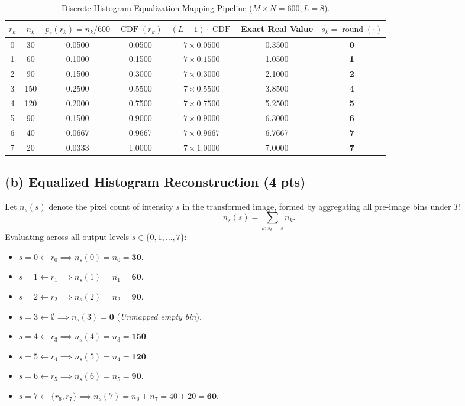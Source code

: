 \documentclass[11pt,a4paper]{article}
\begin{document}
\begin{table}[htbp]
\centering
\caption{Discrete Histogram Equalization Mapping Pipeline ($M \times N = 600, L = 8$).}
\label{tab:p5_equalization}
\begin{tabular}{ccccccc}
\toprule
\textbf{$r_k$} & \textbf{$n_k$} & \textbf{$p_r(r_k) = n_k/600$} & \textbf{$\operatorname{CDF}(r_k)$} & \textbf{$(L-1) \cdot \operatorname{CDF}$} & \textbf{Exact Real Value} & \textbf{$s_k = \operatorname{round}(\cdot)$} \\
\midrule
0 & 30  & 0.0500 & 0.0500 & $7 \times 0.0500$ & 0.3500 & \textbf{0} \\
1 & 60  & 0.1000 & 0.1500 & $7 \times 0.1500$ & 1.0500 & \textbf{1} \\
2 & 90  & 0.1500 & 0.3000 & $7 \times 0.3000$ & 2.1000 & \textbf{2} \\
3 & 150 & 0.2500 & 0.5500 & $7 \times 0.5500$ & 3.8500 & \textbf{4} \\
4 & 120 & 0.2000 & 0.7500 & $7 \times 0.7500$ & 5.2500 & \textbf{5} \\
5 & 90  & 0.1500 & 0.9000 & $7 \times 0.9000$ & 6.3000 & \textbf{6} \\
6 & 40  & 0.0667 & 0.9667 & $7 \times 0.9667$ & 6.7667 & \textbf{7} \\
7 & 20  & 0.0333 & 1.0000 & $7 \times 1.0000$ & 7.0000 & \textbf{7} \\
\bottomrule
\end{tabular}
\end{table}

\subsection{(b) Equalized Histogram Reconstruction (4 pts)}
Let $n_s(s)$ denote the pixel count of intensity $s$ in the transformed image, formed by aggregating all pre-image bins under $T$:
\begin{equation}
n_s(s) = \sum_{k : s_k = s} n_k.
\end{equation}
Evaluating across all output levels $s \in \{0, 1, \dots, 7\}$:
\begin{itemize}
    \item $s = 0 \longleftarrow r_0 \implies n_s(0) = n_0 = \mathbf{30}$.
    \item $s = 1 \longleftarrow r_1 \implies n_s(1) = n_1 = \mathbf{60}$.
    \item $s = 2 \longleftarrow r_2 \implies n_s(2) = n_2 = \mathbf{90}$.
    \item $s = 3 \longleftarrow \emptyset \implies n_s(3) = \mathbf{0}$ \quad (\textit{Unmapped empty bin}).
    \item $s = 4 \longleftarrow r_3 \implies n_s(4) = n_3 = \mathbf{150}$.
    \item $s = 5 \longleftarrow r_4 \implies n_s(5) = n_4 = \mathbf{120}$.
    \item $s = 6 \longleftarrow r_5 \implies n_s(6) = n_5 = \mathbf{90}$.
    \item $s = 7 \longleftarrow \{r_6, r_7\} \implies n_s(7) = n_6 + n_7 = 40 + 20 = \mathbf{60}$.
\end{itemize}
\end{document}
